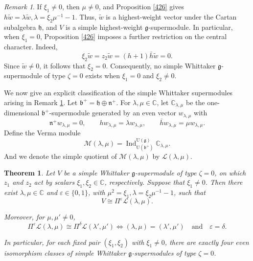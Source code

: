 \documentclass[a4paper,10pt]{article}
\theoremstyle{definition}
\theoremstyle{plain}
\newtheorem{theorem}[definition]{Theorem}
\theoremstyle{remark}
\newtheorem{remark}[definition]{Remark}
\theoremstyle{mystyle}
\numberwithin{equation}{section}
\begin{document}
\begin{remark}\label{428}
    If $\xi_1\neq 0$, then $\mu\neq 0$, and Proposition \ref{426} gives $h\widetilde w=\lambda\widetilde w, \lambda=\xi_2\mu^{-1}-1$.
    Thus, $\widetilde w$ is a highest-weight vector under the Cartan subalgebra $\mathfrak h$, and $V$ is a simple highest-weight $\mathfrak g$-supermodule. 
    In particular, when $\xi_1=0$, Proposition \ref{426} imposes a further restriction on the central character. Indeed,
    $$
        \xi_2\widetilde w=z_2\widetilde w=(h+1)\bar h\widetilde w=0.
    $$ 
    Since \(\widetilde w\neq0\), it follows that \(\xi_2=0\). Consequently, no simple Whittaker \(\mathfrak g\)-supermodule of type \(\zeta=0\) exists when \(\xi_1=0\) and \(\xi_2\neq0\).
\end{remark}
We now give an explicit classification of the simple Whittaker supermodules arising in Remark \ref{428}. Let $\mathfrak b^+=\mathfrak h\oplus\mathfrak n^+$. For \(\lambda,\mu\in\mathbb C\), let \(\mathbb C_{\lambda,\mu}\) be the one-dimensional \(\mathfrak b^+\)-supermodule generated by an even vector \(w_{\lambda,\mu}\) with
\[
\mathfrak n^+w_{\lambda,\mu}=0,\qquad
hw_{\lambda,\mu}=\lambda w_{\lambda,\mu},\qquad
\bar h w_{\lambda,\mu}=\mu w_{\lambda,\mu}.
\]
Define the Verma module
\[
\mathcal{M}(\lambda,\mu)
=\operatorname{Ind}_{\mathrm{U}(\mathfrak b^+)}^{\mathrm{U}(\mathfrak g)}
\mathbb C_{\lambda,\mu}.
\]
And we denote the simple quotient of $\mathcal{M}(\lambda,\mu)$ by $\mathcal{L}(\lambda,\mu)$. 
\begin{theorem}\label{high}
    Let \(V\) be a simple Whittaker \(\mathfrak g\)-supermodule of type \(\zeta=0\), on which \(z_1\) and \(z_2\) act by scalars \(\xi_1,\xi_2\in\mathbb C\), respectively. Suppose that \(\xi_1\neq0\). Then there exist \(\lambda,\mu\in\mathbb C\) and \(\varepsilon\in\{0,1\}\), with \(\mu^2=\xi_1,\lambda=\xi_2\mu^{-1}-1\), such that
    \[
    V\cong\Pi^\varepsilon \mathcal{L}\left(\lambda,\mu\right).
    \]

    Moreover, for \(\mu,\mu'\neq0\),
    \[
    \Pi^\varepsilon \mathcal{L}(\lambda,\mu)\cong\Pi^\delta \mathcal{L}(\lambda',\mu')\iff
    (\lambda,\mu)=(\lambda',\mu')
    \quad\text{and}\quad
    \varepsilon=\delta.
    \]

    In particular, for each fixed pair \((\xi_1,\xi_2)\) with \(\xi_1\neq0\), there are exactly four even isomorphism classes of simple Whittaker \(\mathfrak g\)-supermodules of type \(\zeta=0\).
\end{theorem}
\end{document}
